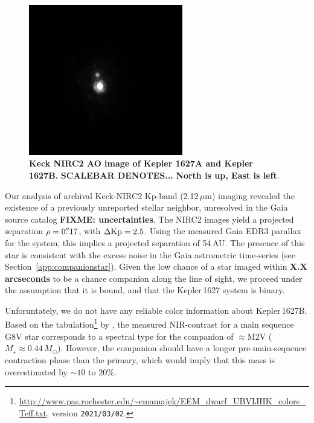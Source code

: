 \documentclass[12pt,modern,twocolumn,tighten]{aastex63}
\begin{document}
\begin{figure}[t]
	\begin{center}
		\leavevmode
		\includegraphics[width=0.6\textwidth]{TEMP_binarity_ao.png}
	\end{center}
	\vspace{-0.7cm}
	\caption{
    {\bf Keck NIRC2 AO image of Kepler 1627A and Kepler 1627B.}  
    {\bf SCALEBAR DENOTES...}
    {\bf North is up, East is left}.
    \label{fig:ao}
	}
\end{figure}

Our analysis of archival Keck-NIRC2 Kp-band (2.12\,$\mu $m) imaging
revealed the existence of a previously unreported stellar neighbor,
unresolved in the Gaia source catalog {\bf FIXME: uncertainties}.  The
NIRC2 images yield a projected separation $\rho=0\mbox{$.\!\!^{\prime\prime}$}17$, with
$\Delta {\rm Kp} = 2.5$.  Using the measured Gaia EDR3 parallax for
the system, this implies a projected separation of 54\,AU.  The
presence of this star is consistent with the excess noise in the Gaia
astrometric time-series (see Section~\ref{app:companionstar}).  Given
the low chance of a star imaged within {\bf X.X arcseconds} to be a
chance companion along the line of sight, we proceed under the
assumption that it is bound, and that the Kepler\,1627 system is
binary.

Unforuntately, we do not have any reliable color information about
Kepler\,1627B.  Based on the
tabulation\footnote{\url{http://www.pas.rochester.edu/~emamajek/EEM_dwarf_UBVIJHK_colors_Teff.txt},
version \texttt{2021/03/02}.} by \citet{pecaut_mamajek_2013}, the
measured NIR-contrast for a main sequence G8V star corresponds to a
spectral type for the companion of $\approx$M2V ($M_\star \approx
0.44\,M_\odot$).  However, the companion should have a longer
pre-main-sequence contraction phase than the primary, which would
imply that this mass is overestimated by $\sim10$ to $20\%$.
\end{document}
